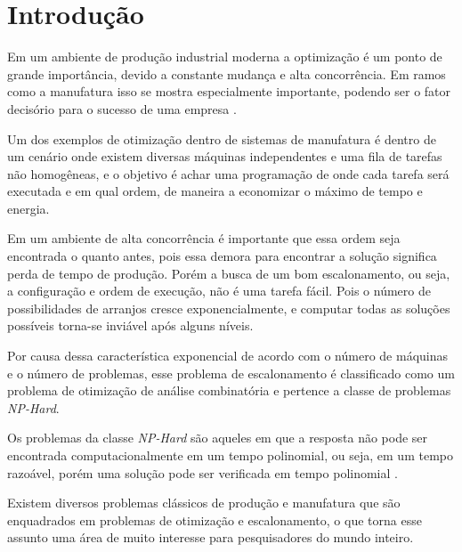 
\chapter{Introdução}
    Em um ambiente de produção industrial moderna a optimização é um ponto de grande importância, devido a constante mudança e alta concorrência. Em ramos como a manufatura isso se mostra especialmente importante, podendo ser o fator decisório para o sucesso de uma empresa \cite{Wari2016}.\newline

    Um dos exemplos de otimização dentro de sistemas de manufatura é dentro de um cenário onde existem diversas máquinas independentes e uma fila de tarefas não homogêneas, e o objetivo é achar uma programação de onde cada tarefa será executada e em qual ordem, de maneira a economizar o máximo de tempo e energia.\newline

    Em um ambiente de alta concorrência é importante que essa ordem seja encontrada o quanto antes, pois essa demora para encontrar a solução significa perda de tempo de produção. Porém a busca de um bom escalonamento, ou seja, a configuração e ordem de execução, não é uma tarefa fácil. Pois o número de possibilidades de arranjos cresce exponencialmente, e computar todas as soluções possíveis torna-se inviável após alguns níveis. \newline

    Por causa dessa característica exponencial de acordo com o número de máquinas e o número de problemas, esse problema de escalonamento é classificado como um problema de otimização de análise combinatória e pertence a classe de problemas \textit{NP-Hard}. \newline

    Os problemas da classe \textit{NP-Hard} são aqueles em que a resposta não pode ser encontrada computacionalmente em um tempo polinomial, ou seja, em um tempo razoável, porém uma solução pode ser verificada em tempo polinomial \cite{Eswaramurthy2008}.\newline

    Existem diversos problemas clássicos de produção e manufatura que são enquadrados em problemas de otimização e escalonamento, o que torna esse assunto uma área de muito interesse para pesquisadores do mundo inteiro.\newline

